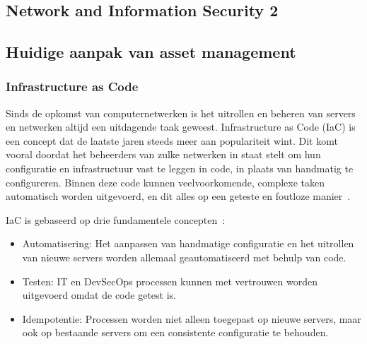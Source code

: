 \chapter{}%
\label{ch:stand-van-zaken}



\section{Network and Information Security 2}%
\label{sec:nis2}

\section{Huidige aanpak van asset management}%
\label{sec:huidige_aanpak_van_asset_management}

\subsection{Infrastructure as Code}%
\label{sub:iac}

Sinds de opkomst van computernetwerken is het uitrollen en beheren van servers en netwerken altijd een uitdagende taak geweest.
Infrastructure as Code (IaC) is een concept dat de laatste jaren steeds meer aan populariteit wint. Dit komt vooral doordat het beheerders van zulke netwerken in staat stelt om hun configuratie en infrastructuur vast te leggen in code, in plaats van handmatig te configureren.
Binnen deze code kunnen veelvoorkomende, complexe taken automatisch worden uitgevoerd, en dit alles op een geteste en foutloze manier~\autocite{chef-what-is-iac}.

IaC is gebaseerd op drie fundamentele concepten~\autocite{chef-what-is-iac}:
\begin{itemize}
    \item Automatisering: Het aanpassen van handmatige configuratie en het uitrollen van nieuwe servers worden allemaal geautomatiseerd met behulp van code.
    \item Testen: IT en DevSecOps processen kunnen met vertrouwen worden uitgevoerd omdat de code getest is.
    \item Idempotentie: Processen worden niet alleen toegepast op nieuwe servers, maar ook op bestaande servers om een consistente configuratie te behouden.
\end{itemize}

